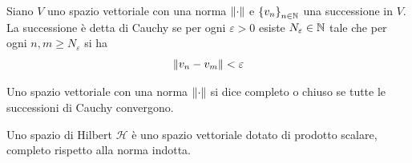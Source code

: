 \documentclass[a4paper, 11pt]{article}
\renewcommand{\H}{\mathcal{H}}
\begin{document}
	\begin{definition}
		Siano $V$ uno spazio vettoriale con una norma $\left\Vert\cdot\right\Vert$ e $\left\{v_n\right\}_{n\in \mathbb{N}}$ una successione in $V$. La successione è detta di Cauchy se per ogni $\varepsilon>0$ esiste $N_\varepsilon\in \mathbb{N} $ tale che per ogni $n,m\geq N_\varepsilon$ si ha
		\[\left\Vert v_n-v_m\right\Vert<\varepsilon\]
	\end{definition}
	\begin{definition}
		Uno spazio vettoriale con una norma $\left\Vert\cdot\right\Vert$ si dice completo o chiuso se tutte le successioni di Cauchy convergono.
	\end{definition}
	\begin{definition}
		Uno spazio di Hilbert $\H$ è uno spazio vettoriale dotato di prodotto scalare, completo rispetto alla norma indotta.	
	\end{definition}
\end{document}

